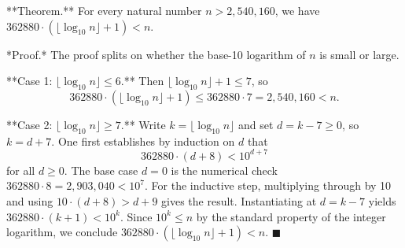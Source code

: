 **Theorem.** For every natural number $n > 2{,}540{,}160$, we have $362880 \cdot (\lfloor \log_{10} n \rfloor + 1) < n$.

*Proof.* The proof splits on whether the base-10 logarithm of $n$ is small or large.

**Case 1: $\lfloor \log_{10} n \rfloor \leq 6$.** Then $\lfloor \log_{10} n \rfloor + 1 \leq 7$, so
$$362880 \cdot (\lfloor \log_{10} n \rfloor + 1) \leq 362880 \cdot 7 = 2{,}540{,}160 < n.$$

**Case 2: $\lfloor \log_{10} n \rfloor \geq 7$.** Write $k = \lfloor \log_{10} n \rfloor$ and set $d = k - 7 \geq 0$, so $k = d + 7$. One first establishes by induction on $d$ that
$$362880 \cdot (d + 8) < 10^{d+7}$$
for all $d \geq 0$. The base case $d = 0$ is the numerical check $362880 \cdot 8 = 2{,}903{,}040 < 10^7$. For the inductive step, multiplying through by 10 and using $10 \cdot (d + 8) > d + 9$ gives the result. Instantiating at $d = k - 7$ yields $362880 \cdot (k + 1) < 10^k$. Since $10^k \leq n$ by the standard property of the integer logarithm, we conclude $362880 \cdot (\lfloor \log_{10} n \rfloor + 1) < n$. $\blacksquare$